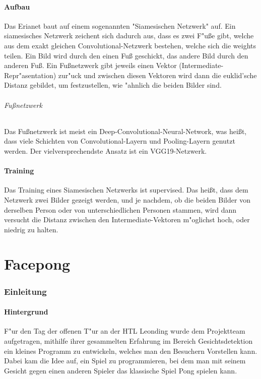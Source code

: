 \documentclass[12pt]{article}
\begin{document}
\subsection{Aufbau}
\label{neuralfoot}
Das Erianet baut auf einem sogenannten "Siamesischen Netzwerk" auf.
Ein siamesisches Netzwerk zeichent sich dadurch aus, dass es zwei
{\glqq}F"u{\ss}e{\grqq} gibt, welche aus dem exakt gleichen Convolutional-Netzwerk 
bestehen, welche sich die weights teilen. Ein Bild wird durch den
einen Fu{\ss} geschickt, das andere Bild durch den anderen Fu{\ss}.
Ein Fu{\ss}netzwerk gibt jeweils einen Vektor (Intermediate-Repr"asentation)
zur"uck und zwischen diesen Vektoren wird dann die euklid'sche Distanz
gebildet, um festzustellen, wie "ahnlich die beiden Bilder sind.
\paragraph{Fu{\ss}netzwerk}
Das Fu{\ss}netzwerk ist meist ein Deep-Convolutional-Neural-Network, was hei{\ss}t,
dass viele Schichten von Convolutional-Layern und Pooling-Layern genutzt werden.
Der vielversprechendste Ansatz ist ein VGG19-Netzwerk.
\subsection{Training}
Das Training eines Siamesischen Netzwerks ist supervised. Das hei{\ss}t, dass
dem Netzwerk zwei Bilder gezeigt werden, und je nachdem, ob die beiden Bilder
von derselben Person oder von unterschiedlichen Personen stammen, wird dann 
versucht die Distanz zwischen den Intermediate-Vektoren m"oglichst hoch, oder 
niedrig zu halten.

\part{Facepong}
\section{Einleitung}
\subsection{Hintergrund}
F"ur den Tag der offenen T"ur an der HTL Leonding wurde dem Projektteam
aufgetragen, mithilfe ihrer gesammelten Erfahrung im Bereich Gesichtsdetektion
ein kleines Programm zu entwickeln, welches man den Besuchern Vorstellen kann.
Dabei kam die Idee auf, ein Spiel zu programmieren, bei dem man mit seinem Gesicht
gegen einen anderen Spieler das klassische Spiel {\glqq} Pong{\grqq} spielen kann.
\end{document}
